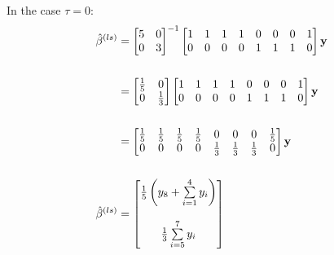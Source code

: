 \documentclass[a4paper]{article}
\begin{document}
\begin{minipage}[t]{0.45\linewidth}
In the case $\tau=0$:
\begin{align*}
  \hat{\beta}^{(ls)} 
  &=
    \begin{bmatrix}
      5 & 0\\
      0 & 3\\
    \end{bmatrix}^{-1}
    \begin{bmatrix}
      1 & 1 & 1 & 1 & 0 & 0 & 0 & 1\\
      0 & 0 & 0 & 0 & 1 & 1 & 1 & 0\\
    \end{bmatrix}
    \mathbf{y}\\\\
  &=
    \begin{bmatrix}
      \frac{1}{5} & 0\\
      0 & \frac{1}{3}\\
    \end{bmatrix}
    \begin{bmatrix}
      1 & 1 & 1 & 1 & 0 & 0 & 0 & 1\\
      0 & 0 & 0 & 0 & 1 & 1 & 1 & 0\\
    \end{bmatrix}
    \mathbf{y}\\\\
  &=
    \begin{bmatrix}
      \frac{1}{5} & \frac{1}{5} & \frac{1}{5} & \frac{1}{5} & 0 & 0 & 0 & \frac{1}{5}\\
      0 & 0 & 0 & 0 & \frac{1}{3} & \frac{1}{3} & \frac{1}{3} & 0\\
    \end{bmatrix} \mathbf{y}\\\\
  \hat{\beta}^{(ls)} 
  &=
    \begin{bmatrix}
      \frac{1}{5}\left(y_8+\sum\limits_{i=1}^4 y_i\right)\\\\
      \frac{1}{3}\sum\limits_{i=5}^7 y_i\vspace{2pt}\\
    \end{bmatrix}
\end{align*}
\end{minipage}
\end{document}

